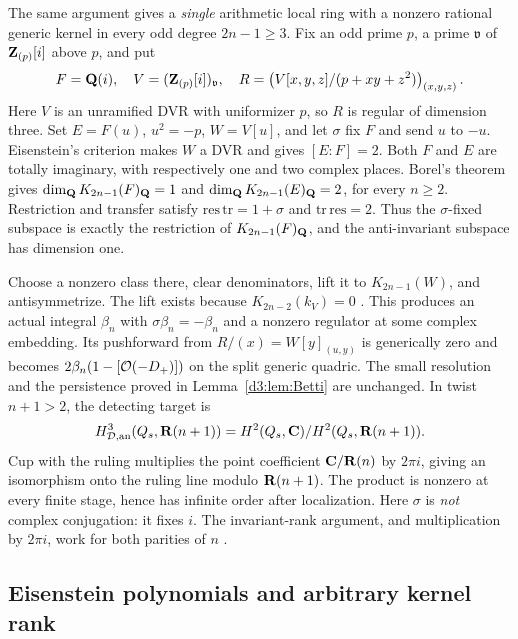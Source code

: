 \begin{remark}
\label{d3:rem:fixedgaussianallodd}
The same argument gives a \emph{single} arithmetic local
ring with a nonzero rational generic kernel in every odd degree
\(2n-1\ge3\). Fix an odd prime \(p\), a prime \(\mathfrak v\)
of \(\mathbf Z_{(p)}[i]\) above \(p\), and put
\[
 F=\mathbf Q(i),\quad V=(\mathbf Z_{(p)}[i])_{\mathfrak v},\quad
 R=\left(V[x,y,z]/(p+xy+z^2)\right)_{(x,y,z)}.
\]
Here \(V\) is an unramified DVR with uniformizer \(p\), so \(R\)
is regular of dimension three. Set \(E=F(u)\), \(u^2=-p\),
\(W=V[u]\), and let \(\sigma\) fix \(F\) and send \(u\) to \(-u\).
Eisenstein's criterion makes \(W\) a DVR and gives \([E:F]=2\).
Both \(F\) and \(E\) are totally imaginary, with respectively
one and two complex places. Borel's theorem \cite[Proposition~12.2]{Borel} gives
\(\dim_{\mathbf Q}K_{2n-1}(F)_{\mathbf Q}=1\) and
\(\dim_{\mathbf Q}K_{2n-1}(E)_{\mathbf Q}=2\), for every \(n\ge2\).
Restriction and transfer satisfy
\(\mathrm{res}\,\mathrm{tr}=1+\sigma\) and
\(\mathrm{tr}\,\mathrm{res}=2\).
Thus the \(\sigma\)-fixed subspace is exactly the restriction
of \(K_{2n-1}(F)_{\mathbf Q}\), and the anti-invariant subspace has
dimension one.

Choose a nonzero class there, clear denominators, lift it to
\(K_{2n-1}(W)\), and antisymmetrize. The lift exists because
\(K_{2n-2}(k_V)=0\)
\cite[Chapter~IV, Corollary~1.13]{Weibel}. This produces an actual integral
\(\beta_n\) with \(\sigma\beta_n=-\beta_n\) and a nonzero
regulator at some complex embedding. Its pushforward from
\(R/(x)=W[y]_{(u,y)}\) is generically zero and becomes
\(2\beta_n(1-[\mathcal O(-D_+)])\) on the split generic quadric.
The small resolution and the persistence proved in
Lemma~\ref{d3:lem:Betti} are unchanged. In twist \(n+1>2\), the detecting target is
\[
 H_{\mathcal D,\mathrm{an}}^3(Q_s,\mathbf R(n+1))
   =H^2(Q_s,\mathbf C)/H^2(Q_s,\mathbf R(n+1)).
\]
Cup with the ruling multiplies the point coefficient
\(\mathbf C/\mathbf R(n)\) by \(2\pi i\), giving an isomorphism onto the
ruling line modulo \(\mathbf R(n+1)\). The product is nonzero at
every finite stage, hence has infinite order after localization.
Here \(\sigma\) is \emph{not} complex conjugation: it fixes \(i\).
The invariant-rank argument, and multiplication by \(2\pi i\),
work for both parities of \(n\) \cite{Borel,BunkeTamme,Quillen}.
\end{remark}


\subsection{Eisenstein polynomials and arbitrary kernel rank}\label{d3:sec:eisenstein}

